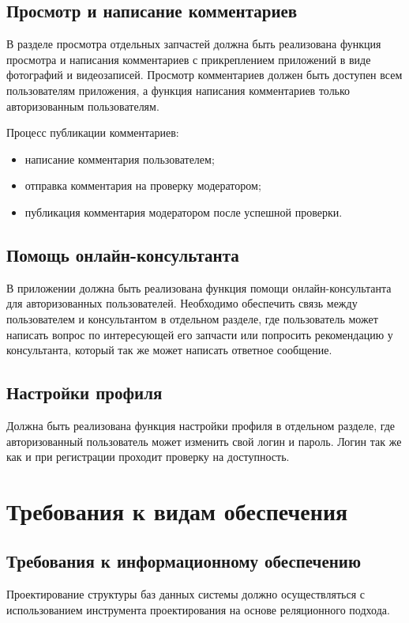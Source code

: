 \documentclass[14pt]{extreport}
\begin{document}
\subsection{Просмотр и написание комментариев}
В разделе просмотра отдельных запчастей должна быть реализована функция просмотра и написания комментариев с прикреплением приложений в виде фотографий и видеозаписей. Просмотр комментариев должен быть доступен всем пользователям приложения, а функция написания комментариев только авторизованным пользователям.

Процесс публикации комментариев:
\begin{itemize}
	\item написание комментария пользователем;
	\item отправка комментария на проверку модератором;
	\item публикация комментария модератором после успешной проверки. 
\end{itemize}

\subsection{Помощь онлайн-консультанта}
В приложении должна быть реализована функция помощи онлайн-консультанта для авторизованных пользователей. Необходимо обеспечить связь между пользователем и консультантом в отдельном разделе, где пользователь может написать вопрос по интересующей его запчасти или попросить рекомендацию у консультанта, который так же может написать ответное сообщение. 
 
\subsection{Настройки профиля}
Должна быть реализована функция настройки профиля в отдельном разделе, где авторизованный пользователь может изменить свой логин и пароль. Логин так же как и при регистрации проходит проверку на доступность.


\section{Требования к видам обеспечения}

\subsection{Требования к информационному обеспечению}
Проектирование структуры баз данных системы должно осуществляться с использованием инструмента проектирования на основе реляционного подхода.
\end{document}
